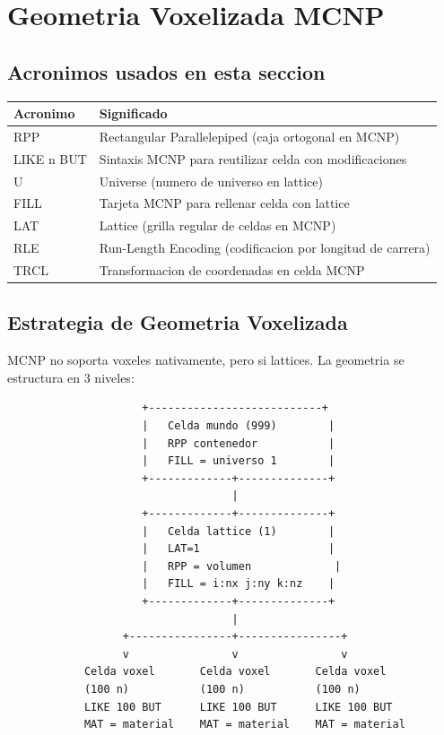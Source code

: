 \documentclass[12pt,a4paper]{article}
\begin{document}
\newpage

\section{Geometria Voxelizada MCNP}
\label{sec:geometria}

\subsection*{Acronimos usados en esta seccion}
\begin{tabular}{ll}
\toprule
\textbf{Acronimo} & \textbf{Significado} \\
\midrule
RPP & Rectangular Parallelepiped (caja ortogonal en MCNP) \\
LIKE n BUT & Sintaxis MCNP para reutilizar celda con modificaciones \\
U & Universe (numero de universo en lattice) \\
FILL & Tarjeta MCNP para rellenar celda con lattice \\
LAT & Lattice (grilla regular de celdas en MCNP) \\
RLE & Run-Length Encoding (codificacion por longitud de carrera) \\
TRCL & Transformacion de coordenadas en celda MCNP \\
\bottomrule
\end{tabular}

\subsection{Estrategia de Geometria Voxelizada}

MCNP no soporta voxeles nativamente, pero si lattices. La geometria se estructura en 3 niveles:

\begin{verbatim}
                     +---------------------------+
                     |   Celda mundo (999)        |
                     |   RPP contenedor           |
                     |   FILL = universo 1        |
                     +-------------+--------------+
                                   |
                     +-------------+--------------+
                     |   Celda lattice (1)        |
                     |   LAT=1                    |
                     |   RPP = volumen             |
                     |   FILL = i:nx j:ny k:nz    |
                     +-------------+--------------+
                                   |
                  +----------------+----------------+
                  v                v                v
            Celda voxel       Celda voxel       Celda voxel
            (100 n)           (100 n)           (100 n)
            LIKE 100 BUT      LIKE 100 BUT      LIKE 100 BUT
            MAT = material    MAT = material    MAT = material
\end{verbatim}
\end{document}
